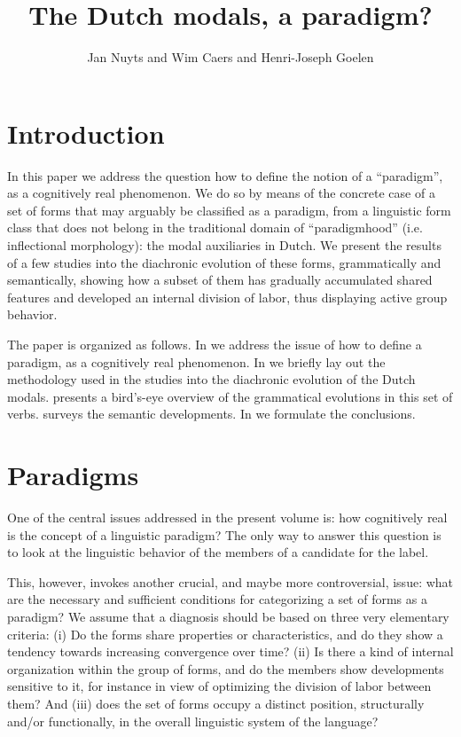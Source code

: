 \documentclass[output=paper]{langsci/langscibook}
\author{Jan Nuyts\affiliation{University of Antwerp} and Wim Caers\affiliation{University of Antwerp} and Henri-Joseph Goelen\affiliation{University of Antwerp}}
\title{The Dutch modals, a paradigm?}
\begin{document}
\maketitle 

\section{Introduction}\label{nuyts:1}\largerpage

In this paper we address the question how to define the notion of a “paradigm”, as a cognitively real phenomenon. We do so by means of the concrete case of a set of forms that may arguably be classified as a paradigm, from a linguistic form class that does not belong in the traditional domain of “paradigmhood” (i.e. inflectional morphology): the modal auxiliaries in Dutch. We present the results of a few studies into the diachronic evolution of these forms, grammatically and semantically, showing how a subset of them has gradually accumulated shared features and developed an internal division of labor, thus displaying active group behavior.

The paper is organized as follows. In  we address the issue of how to define a paradigm, as a cognitively real phenomenon. In  we briefly lay out the methodology used in the studies into the diachronic evolution of the Dutch modals.  presents a bird's-eye overview of the grammatical evolutions in this set of verbs.  surveys the semantic developments. In  we formulate the conclusions.

\section{Paradigms} \label{nuyts:2}

One of the central issues addressed in the present volume is: how cognitively real is the concept of a linguistic paradigm? The only way to answer this question is to look at the linguistic behavior of the members of a candidate for the label.

This, however, invokes another crucial, and maybe more controversial, issue: what are the necessary and sufficient conditions for categorizing a set of forms as a paradigm? We assume that a diagnosis should be based on three very elementary criteria: (i) Do the forms share properties or characteristics, and do they show a tendency towards increasing convergence over time? (ii) Is there a kind of internal organization within the group of forms, and do the members show developments sensitive to it, for instance in view of optimizing the division of labor between them? And (iii) does the set of forms occupy a distinct position, structurally and/or functionally, in the overall linguistic system of the language? 
\end{document}
